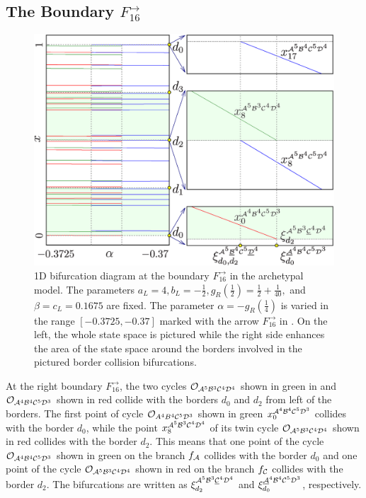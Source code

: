 \subsection{The Boundary $F_{16}^\rightarrow$}
\label{sec:arch.bif.R}

\begin{figure}
	\centering
	\includegraphics[width=.7 \textwidth]{../Figures/6/6.7/result.png}
	\caption[1D bifurcation diagram at the boundary $F_{16}^\rightarrow$ in the archetypal model]{
		1D bifurcation diagram at the boundary $F_{16}^\rightarrow$ in the archetypal model.
		The parameters $a_L = 4, b_L = -\frac{1}{2}, g_R\left(\frac{1}{2}\right) = \frac{1}{2} + \frac{1}{40},$ and $\beta = c_L = 0.1675$ are fixed.
		The parameter $\alpha = -g_R\left(\frac{1}{4}\right)$ is varied in the range $[-0.3725, -0.37]$ marked with the arrow $F_{16}^\rightarrow$ in .
		On the left, the whole state space is pictured while the right side enhances the area of the state space around the borders involved in the pictured border collision bifurcations.
	}
	\label{fig:arch.bif.F.right}
\end{figure}

At the right boundary $F_{16}^\rightarrow$, the two cycles $\mathcal{O}_{\mathcal{A}^5\mathcal{B}^3\mathcal{C}^4\mathcal{D}^4}$ shown in green in  and $\mathcal{O}_{\mathcal{A}^4\mathcal{B}^4\mathcal{C}^5\mathcal{D}^3}$ shown in red collide with the borders $d_0$ and $d_2$ from left of the borders.
The first point of cycle $\mathcal{O}_{A^4B^4\mathcal{C}^5\mathcal{D}^3}$ shown in green $x_{0}^{\mathcal{A}^4\mathcal{B}^4\mathcal{C}^5\mathcal{D}^3}$ collides with the border $d_0$, while the point $x_{8}^{\mathcal{A}^5\mathcal{B}^3\mathcal{C}^4\mathcal{D}^4}$ of its twin cycle $\mathcal{O}_{\mathcal{A}^5\mathcal{B}^3\mathcal{C}^4\mathcal{D}^4}$ shown in red collides with the border $d_2$.
This means that one point of the cycle $\mathcal{O}_{\mathcal{A}^4\mathcal{B}^4\mathcal{C}^5\mathcal{D}^3}$ shown in green on the branch $f_{\mathcal{A}}$ collides with the border $d_0$ and one point of the cycle $\mathcal{O}_{\mathcal{A}^5\mathcal{B}^3\mathcal{C}^4\mathcal{D}^4}$ shown in red on the branch $f_{\mathcal{C}}$ collides with the border $d_2$.
The bifurcations are written as $\xi_{d_2}^{\mathcal{A}^5\mathcal{B}^3\underline{\mathcal{C}}^4\mathcal{D}^4}$ and $\xi_{d_0}^{\underline{\mathcal{A}}^4\mathcal{B}^4\mathcal{C}^5\mathcal{D}^3}$, respectively.

